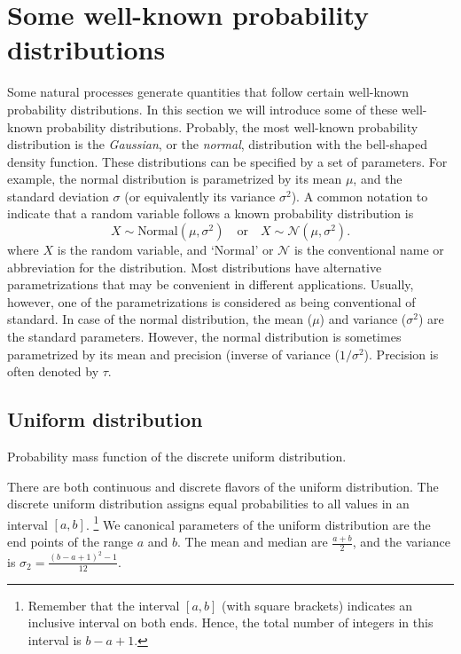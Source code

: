 \section{Some well-known probability distributions}

Some natural processes generate quantities that follow
certain well-known probability distributions.
In this section we will introduce some of these well-known probability distributions.
Probably,
the most well-known probability distribution is the \emph{Gaussian},
or the \emph{normal}, distribution with the bell-shaped density function.
These distributions can be specified by a set of parameters.
For example,
the normal distribution is parametrized by its mean $\mu$,
and the standard deviation $\sigma$ (or equivalently its variance $\sigma^{2}$).
A common notation to indicate that
a random variable follows a known probability distribution is  
\[
  X \sim \text{Normal}(\mu, \sigma^{2})\quad\text{or}\quad
  X \sim \mathcal{N}(\mu, \sigma^{2}).
\]
where $X$ is the random variable,
and `Normal' or $\mathcal{N}$ is
the conventional name or abbreviation for the distribution.
Most distributions have alternative parametrizations
that may be convenient in different applications.
Usually, however,
one of the parametrizations is considered as being conventional of standard.
In case of the normal distribution,
the mean ($\mu$) and variance ($\sigma^{2}$) are the standard parameters.
However, the normal distribution is sometimes parametrized
by its mean and precision (inverse of variance ($1/\sigma^{2}$).
Precision is often denoted by $\tau$.

\subsection{Uniform distribution}

\begin{marginfigure}
  \caption{\label{fig:disc-uniform}Probability mass function
    of the discrete uniform distribution.}
\end{marginfigure}
There are both continuous and discrete flavors of the uniform distribution.
The discrete uniform distribution assigns equal probabilities
to all values in an interval $[a, b]$.%
\footnote{Remember that the interval $[a, b]$ 
  (with square brackets) indicates an inclusive interval on both ends.
  Hence, the total number of integers in this interval is $b - a + 1$.
}
We canonical parameters of the uniform distribution are
the end points of the range $a$ and $b$.
The mean and median are $\frac{a+b}{2}$,
and the variance is $\sigma_{2} = \frac{(b-a+1)^{2} - 1}{12}$.

